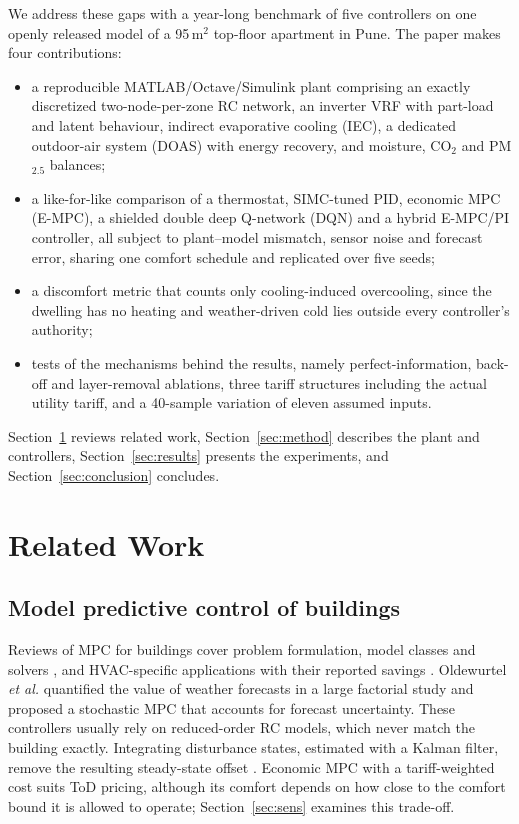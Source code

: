 We address these gaps with a year-long benchmark of five controllers on one openly
released model of a 95\,m$^2$ top-floor apartment in Pune. The paper makes four
contributions:
\begin{itemize}
\item a reproducible MATLAB/Octave/Simulink plant comprising an exactly discretized
      two-node-per-zone RC network, an inverter VRF with part-load and latent
      behaviour, indirect evaporative cooling (IEC), a dedicated outdoor-air system
      (DOAS) with energy recovery, and moisture, CO$_2$ and PM$_{2.5}$ balances;
\item a like-for-like comparison of a thermostat, SIMC-tuned PID, economic MPC (E-MPC),
      a shielded double deep Q-network (DQN) and a hybrid E-MPC/PI controller, all
      subject to plant--model mismatch, sensor noise and forecast error, sharing one
      comfort schedule and replicated over five seeds;
\item a discomfort metric that counts only cooling-induced overcooling, since the
      dwelling has no heating and weather-driven cold lies outside every controller's
      authority;
\item tests of the mechanisms behind the results, namely perfect-information, back-off
      and layer-removal ablations, three tariff structures including the actual utility
      tariff, and a 40-sample variation of eleven assumed inputs.
\end{itemize}
Section~\ref{sec:related} reviews related work, Section~\ref{sec:method} describes the
plant and controllers, Section~\ref{sec:results} presents the experiments, and
Section~\ref{sec:conclusion} concludes.

\section{Related Work}\label{sec:related}
\subsection{Model predictive control of buildings}
Reviews of MPC for buildings cover problem formulation, model classes and solvers
\cite{afram2014,drgona2020}, and HVAC-specific applications with their reported savings
\cite{yao2021}. Oldewurtel \emph{et al.} \cite{oldewurtel2012} quantified the value of
weather forecasts in a large factorial study and proposed a stochastic MPC that
accounts for forecast uncertainty. These controllers usually rely on reduced-order RC models,
which never match the building exactly. Integrating disturbance states, estimated with a
Kalman filter, remove the resulting steady-state offset \cite{pannocchia2003}. Economic
MPC with a tariff-weighted cost suits ToD pricing, although its comfort depends on how
close to the comfort bound it is allowed to operate; Section~\ref{sec:sens} examines
this trade-off.

